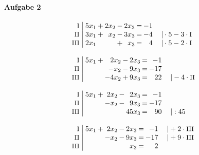 \paragraph{Aufgabe 2}
\begin{equation*}
\begin{array}{l}
\setlength{\arraycolsep}{1pt}
\begin{array}{r|rcrcrcrl}
    \text{\small I } &\; 5x_{1} & + & 2x_{2} & - & 2x_{3} & = & -1 &                                    \\
   \text{\small II } &\; 3x_{1} & + &  x_{2} & - & 3x_{3} & = & -4 & \quad|\cdot5-3\cdot\text{\small I} \\
  \text{\small III } &\; 2x_{1} &   &        & + &  x_{3} & = &  4 & \quad|\cdot5-2\cdot\text{\small I}   
\end{array}
\\ \\
\setlength{\arraycolsep}{1pt}
\begin{array}{r|rcrcrcrl}
    \text{\small I } &\; 5x_{1} & + &  2x_{2} & - & 2x_{3} & = &  -1 &                               \\
   \text{\small II } &\;        &   &  -x_{2} & - & 9x_{3} & = & -17 &                               \\
  \text{\small III } &\;        &   & -4x_{2} & + & 9x_{3} & = &  22 & \quad|-4\cdot\text{\small II}   
\end{array}
\\ \\
\setlength{\arraycolsep}{1pt}
\begin{array}{r|rcrcrcrl}
    \text{\small I } &\; 5x_{1} & + & 2x_{2} & - &  2x_{3} & = &  -1 &           \\
   \text{\small II } &\;        &   & -x_{2} & - &  9x_{3} & = & -17 &           \\
  \text{\small III } &\;        &   &        &   & 45x_{3} & = &  90 & \quad|:45   
\end{array}
\\ \\
\setlength{\arraycolsep}{1pt}
\begin{array}{r|rcrcrcrl}
    \text{\small I } &\; 5x_{1} & + & 2x_{2} & - & 2x_{3} & = &  -1 & \quad|+2\cdot\text{\small III} \\
   \text{\small II } &\;        &   & -x_{2} & - & 9x_{3} & = & -17 & \quad|+9\cdot\text{\small III} \\
  \text{\small III } &\;        &   &        &   &  x_{3} & = &   2 &                                  

\end{array}
\end{array}
\end{equation*}
